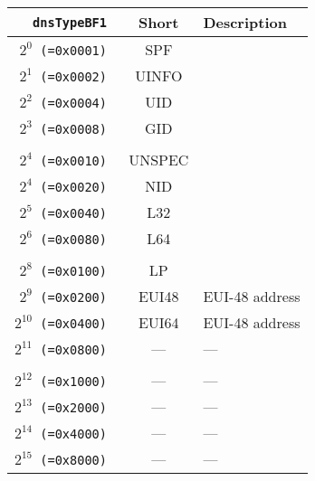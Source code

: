 \documentclass[documentation]{subfiles}
\begin{document}
\begin{longtable}{>{\tt}rcl}
    \toprule
    {\bf dnsTypeBF1}   & {\bf Short} & {\bf Description} \\
    \midrule\endhead%
    $2^{0}$  (=0x0001) & SPF         & \\
    $2^{1}$  (=0x0002) & UINFO       & \\
    $2^{2}$  (=0x0004) & UID         & \\
    $2^{3}$  (=0x0008) & GID         & \\
    \\
    $2^{4}$  (=0x0010) & UNSPEC      & \\
    $2^{4}$  (=0x0020) & NID         & \\
    $2^{5}$  (=0x0040) & L32         & \\
    $2^{6}$  (=0x0080) & L64         & \\
    \\
    $2^{8}$  (=0x0100) & LP          & \\
    $2^{9}$  (=0x0200) & EUI48       & EUI-48 address \\
    $2^{10}$ (=0x0400) & EUI64       & EUI-48 address \\
    $2^{11}$ (=0x0800) & ---         & --- \\
    \\
    $2^{12}$ (=0x1000) & ---         & --- \\
    $2^{13}$ (=0x2000) & ---         & --- \\
    $2^{14}$ (=0x4000) & ---         & --- \\
    $2^{15}$ (=0x8000) & ---         & --- \\
    \bottomrule
\end{longtable}
\end{document}
